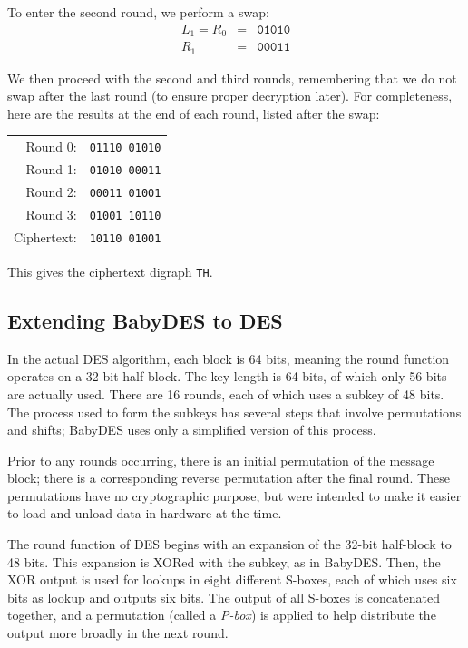 \documentclass{book}
\theoremstyle{plain}
\theoremstyle{definition}
\newcommand{\ciphertext}[1]{\texttt{#1}} %
\begin{document}
To enter the second round, we perform a swap:
\begin{eqnarray*}
L_1 = R_0 &=& \ciphertext{01010} \\
R_1 &=& \ciphertext{00011}
\end{eqnarray*}

We then proceed with the second and third rounds, remembering that we do not swap after the last round (to ensure proper decryption later). For completeness, here are the results at the end of each round, listed after the swap:
\begin{center}
\begin{tabular}{rl}
Round 0: & \ciphertext{01110 01010} \\
Round 1: & \ciphertext{01010 00011} \\
Round 2: & \ciphertext{00011 01001} \\
Round 3: & \ciphertext{01001 10110} \\
Ciphertext: & \ciphertext{10110 01001}
\end{tabular}
\end{center}
This gives the ciphertext digraph \ciphertext{TH}.

\subsection{Extending BabyDES to DES}
In the actual DES algorithm, each block is 64 bits, meaning the round function operates on a 32-bit half-block. The key length is 64 bits, of which only 56 bits are actually used. There are 16 rounds, each of which uses a subkey of 48 bits. The process used to form the subkeys has several steps that involve permutations and shifts; BabyDES uses only a simplified version of this process.

Prior to any rounds occurring, there is an initial permutation of the message block; there is a corresponding reverse permutation after the final round. These permutations have no cryptographic purpose, but were intended to make it easier to load and unload data in hardware at the time.

The round function of DES begins with an expansion of the 32-bit half-block to 48 bits. This expansion is XORed with the subkey, as in BabyDES. Then, the XOR output is used for lookups in eight different S-boxes, each of which uses six bits as lookup and outputs six bits. The output of all S-boxes is concatenated together, and a permutation (called a \textit{P-box}) is applied to help distribute the output more broadly in the next round.
\end{document}
